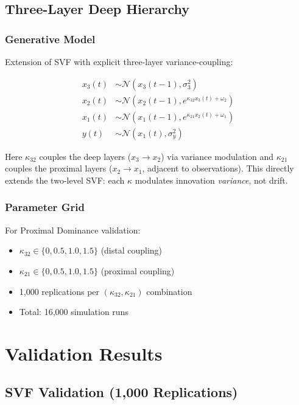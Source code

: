 \documentclass[10pt]{article} %
\theoremstyle{plain}
\theoremstyle{definition}
\begin{document}
\subsection{Three-Layer Deep Hierarchy}

\subsubsection{Generative Model}

Extension of SVF with explicit three-layer variance-coupling:

\begin{align}
x_3(t) &\sim \mathcal{N}(x_3(t-1), \sigma_3^2) \\
x_2(t) &\sim \mathcal{N}(x_2(t-1), e^{\kappa_{32} x_3(t) + \omega_2}) \\
x_1(t) &\sim \mathcal{N}(x_1(t-1), e^{\kappa_{21} x_2(t) + \omega_1}) \\
y(t) &\sim \mathcal{N}(x_1(t), \sigma_y^2)
\end{align}

Here $\kappa_{32}$ couples the deep layers ($x_3 \to x_2$) via variance modulation 
and $\kappa_{21}$ couples the proximal layers ($x_2 \to x_1$, adjacent to observations).
This directly extends the two-level SVF: each $\kappa$ modulates innovation \emph{variance}, not drift.

\subsubsection{Parameter Grid}

For Proximal Dominance validation:
\begin{itemize}
\item $\kappa_{32} \in \{0, 0.5, 1.0, 1.5\}$ (distal coupling)
\item $\kappa_{21} \in \{0, 0.5, 1.0, 1.5\}$ (proximal coupling)
\item 1,000 replications per $(\kappa_{32}, \kappa_{21})$ combination
\item Total: 16,000 simulation runs
\end{itemize}


\section{Validation Results}
\label{app:validation}

\subsection{SVF Validation (1,000 Replications)}
\end{document}
